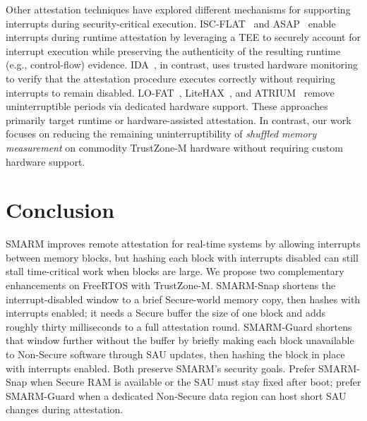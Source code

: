 \documentclass[conference]{IEEEtran}
\newcommand{\smarmcopy}{SMARM-Snap\xspace}
\newcommand{\smarmlock}{SMARM-Guard\xspace}
\begin{document}
Other attestation techniques have explored different mechanisms for supporting interrupts during security-critical execution. ISC-FLAT~\cite{isc-flat} and ASAP~\cite{asap} enable interrupts during runtime attestation by leveraging a TEE to securely account for interrupt execution while preserving the authenticity of the resulting runtime (e.g., control-flow) evidence.
IDA~\cite{ida2024}, in contrast, uses trusted hardware monitoring to verify that the attestation procedure executes correctly without requiring interrupts to remain disabled.
LO-FAT~\cite{lo-fat}, LiteHAX~\cite{litehax}, and ATRIUM~\cite{atrium} remove uninterruptible periods via dedicated hardware support.
These approaches primarily target runtime or hardware-assisted attestation.
In contrast, our work focuses on reducing the remaining uninterruptibility of \emph{shuffled memory measurement} on commodity TrustZone-M hardware without requiring custom hardware support.


\section{Conclusion}
\label{sec:conclusion}
SMARM improves remote attestation for real-time systems by allowing
interrupts between memory blocks, but hashing each block with interrupts
disabled can still stall time-critical work when blocks are large.
We propose two complementary enhancements on FreeRTOS with TrustZone-M.
\smarmcopy{} shortens the interrupt-disabled window to a brief Secure-world
memory copy, then hashes with interrupts enabled; it needs a Secure buffer
the size of one block and adds roughly thirty milliseconds to a full
attestation round.
\smarmlock{} shortens that window further without the buffer by briefly
making each block unavailable to Non-Secure software through SAU updates,
then hashing the block in place with interrupts enabled.
Both preserve SMARM's security goals.
Prefer \smarmcopy{} when Secure RAM is available or the SAU must stay fixed
after boot; prefer \smarmlock{} when a dedicated Non-Secure data region can
host short SAU changes during attestation.
\end{document}
